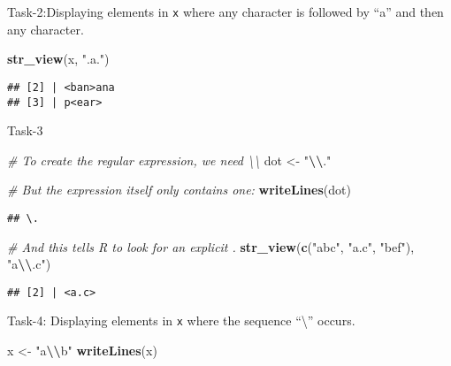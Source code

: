 \documentclass[
]{article}
\newenvironment{Shaded}{\begin{snugshade}}{\end{snugshade}}
\newcommand{\CommentTok}[1]{\textcolor[rgb]{0.56,0.35,0.01}{\textit{#1}}}
\newcommand{\FunctionTok}[1]{\textcolor[rgb]{0.13,0.29,0.53}{\textbf{#1}}}
\newcommand{\NormalTok}[1]{#1}
\newcommand{\OtherTok}[1]{\textcolor[rgb]{0.56,0.35,0.01}{#1}}
\newcommand{\SpecialCharTok}[1]{\textcolor[rgb]{0.81,0.36,0.00}{\textbf{#1}}}
\newcommand{\StringTok}[1]{\textcolor[rgb]{0.31,0.60,0.02}{#1}}
\begin{document}
Task-2:Displaying elements in \texttt{x} where any character is followed
by ``a'' and then any character.

\begin{Shaded}
\begin{Highlighting}[]
\FunctionTok{str\_view}\NormalTok{(x, }\StringTok{".a."}\NormalTok{)}
\end{Highlighting}
\end{Shaded}

\begin{verbatim}
## [2] | <ban>ana
## [3] | p<ear>
\end{verbatim}

Task-3

\begin{Shaded}
\begin{Highlighting}[]
\CommentTok{\# To create the regular expression, we need \textbackslash{}\textbackslash{}}
\NormalTok{dot }\OtherTok{\textless{}{-}} \StringTok{"}\SpecialCharTok{\textbackslash{}\textbackslash{}}\StringTok{."}

\CommentTok{\# But the expression itself only contains one:}
\FunctionTok{writeLines}\NormalTok{(dot)}
\end{Highlighting}
\end{Shaded}

\begin{verbatim}
## \.
\end{verbatim}

\begin{Shaded}
\begin{Highlighting}[]
\CommentTok{\# And this tells R to look for an explicit .}
\FunctionTok{str\_view}\NormalTok{(}\FunctionTok{c}\NormalTok{(}\StringTok{"abc"}\NormalTok{, }\StringTok{"a.c"}\NormalTok{, }\StringTok{"bef"}\NormalTok{), }\StringTok{"a}\SpecialCharTok{\textbackslash{}\textbackslash{}}\StringTok{.c"}\NormalTok{)}
\end{Highlighting}
\end{Shaded}

\begin{verbatim}
## [2] | <a.c>
\end{verbatim}

Task-4: Displaying elements in \texttt{x} where the sequence
``\textbackslash{}'' occurs.

\begin{Shaded}
\begin{Highlighting}[]
\NormalTok{x }\OtherTok{\textless{}{-}} \StringTok{"a}\SpecialCharTok{\textbackslash{}\textbackslash{}}\StringTok{b"}
\FunctionTok{writeLines}\NormalTok{(x)}
\end{Highlighting}
\end{Shaded}
\end{document}
